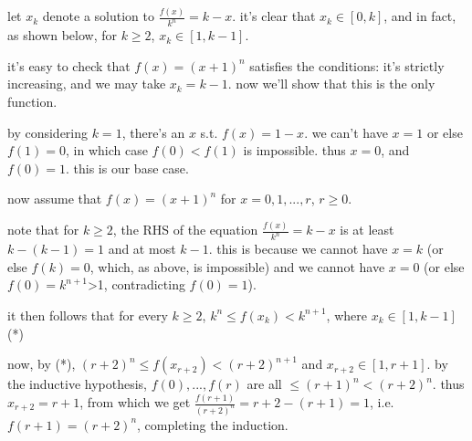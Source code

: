 \begin{solution}
	let $ x_k$ denote a solution to $ \frac {f(x)}{k^n} = k - x$. it's clear that $ x_k\in [0,k]$, and in fact, as shown below, for $ k\geq 2$, $ x_k\in [1,k - 1]$.

it's easy to check that $ f(x) = (x + 1)^n$ satisfies the conditions: it's strictly increasing, and we may take $ x_k = k - 1$. now we'll show that this is the only function.

by considering $ k = 1$, there's an $ x$ s.t. $ f(x) = 1 - x$. we can't have $ x = 1$ or else $ f(1) = 0$, in which case $ f(0) < f(1)$ is impossible. thus $ x = 0$, and $ f(0) = 1$. this is our base case.

now assume that $ f(x) = (x + 1)^n$ for $ x = 0, 1, ..., r$, $ r\geq 0$.

note that for $ k\geq 2$, the RHS of the equation $ \frac {f(x)}{k^n} = k - x$ is at least $ k - (k - 1) = 1$ and at most $ k - 1$. this is because we cannot have $ x = k$ (or else $ f(k) = 0$, which, as above, is impossible) and we cannot have $ x = 0$ (or else $ f(0) = k^{n + 1}$>1, contradicting $ f(0) = 1$).

it then follows that for every $ k\geq 2$, $ k^n\leq f(x_k) < k^{n + 1}$, where $ x_k\in [1,k - 1]$ (*)

now, by (*), $ (r + 2)^n\leq f(x_{r + 2}) < (r + 2)^{n + 1}$ and $ x_{r + 2}\in [1,r + 1]$. by the inductive hypothesis, $ f(0), ..., f(r)$ are all $ \leq (r + 1)^n < (r + 2)^n$. thus $ x_{r + 2} = r + 1$, from which we get $ \frac {f(r + 1)}{(r + 2)^n} = r + 2 - (r + 1) = 1$, i.e. $ f(r + 1) = (r + 2)^n$, completing the induction.
\end{solution}



